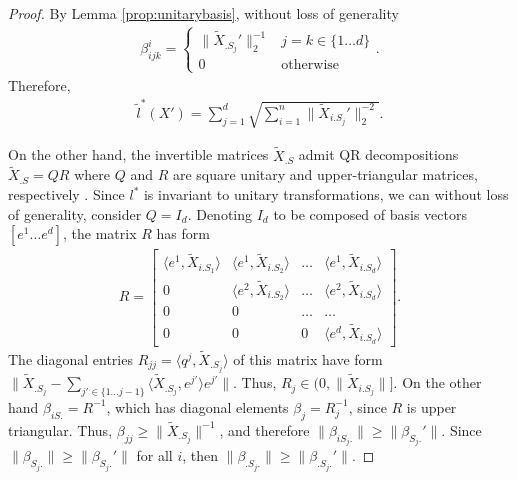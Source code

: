 \begin{proof}

By Lemma \ref{prop:unitarybasis}, without loss of generality
\begin{eqnarray}
\beta_{ijk}^i = \begin{cases} \|\tilde X_{.S_j}'\|_2^{-1} & j = k \in \{ 1 \dots d\}  \\
0 & \text{otherwise}
\end{cases}.
\end{eqnarray}
Therefore,
\begin{eqnarray}
\tilde l^*(X') = \sum_{j = 1}^d \sqrt{\sum_{i = 1}^n \|\tilde X_{i.S_j}' \|_2^{-2}}.
\end{eqnarray}

On the other hand, the invertible matrices $\tilde X_{.S}$ admit QR decompositions $\tilde X_{.S} = QR$ where $Q$ and $R$ are square unitary and upper-triangular matrices, respectively \cite{Anderson1992-fb}.
Since $l^*$ is invariant to unitary transformations, we can without loss of generality, consider $Q= I_d$.
Denoting $I_d$ to be composed of basis vectors $[e^1 \dots e^d]$, the matrix $R$ has form
\begin{eqnarray}
R = \begin{bmatrix}
\langle e^1, \tilde X_{i.{S_1}} \rangle & \langle e^1, \tilde X_{i.{S_2}} \rangle  &\dots &  \langle e^1, \tilde X_{i.{S_d}} \rangle \\
0 & \langle e^2, \tilde X_{i.{S_2}} \rangle & \dots  &  \langle e^2, \tilde X_{i.{S_d}} \rangle\\
0 & 0 & \dots & \dots  \\
0 & 0 & 0& \langle e^d, \tilde X_{i.{S_d}} \rangle 
\end{bmatrix}.
\end{eqnarray}
The diagonal entries $R_{jj} = \langle q^j, \tilde X_{.{S_j}} \rangle$ of this matrix have form $\| \tilde X_{.{S_j}} -  \sum_{j' \in \{1 \dots j-1\}} \langle \tilde X_{.{S_{j}}}, e^{j'} \rangle e^{j'} \|$.
Thus, $R_{j} \in (0, \| \tilde X_{i.{S_j}}\|]$.
On the other hand $\beta_{iS.} =R^{-1}$, which has diagonal elements $\beta_{j} = R_{j}^{-1}$, since $R$ is upper triangular.
Thus, $\beta_{jj} \geq \| \tilde X_{.{S_j}}\|^{-1}$, and therefore $\|\beta_{iS_j.}\| \geq \|\beta_{S_j.}'\|.$
Since $\|\beta_{S_j.}\| \geq \|\beta_{S_j.}'\|$ for all $i$, then $\|\beta_{.S_j.}\| \geq \|\beta_{.S_j.}' \|$.
\end{proof}

